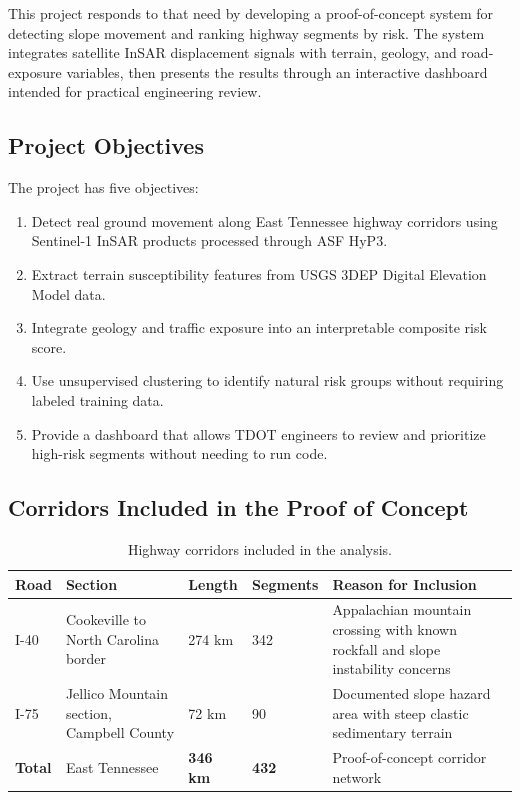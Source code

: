 \documentclass[11pt,letterpaper]{article}
\begin{document}
This project responds to that need by developing a proof-of-concept system for detecting slope movement and ranking highway segments by risk. The system integrates satellite InSAR displacement signals with terrain, geology, and road-exposure variables, then presents the results through an interactive dashboard intended for practical engineering review.

\subsection{Project Objectives}

The project has five objectives:

\begin{enumerate}
  \item Detect real ground movement along East Tennessee highway corridors using Sentinel-1 InSAR products processed through ASF HyP3.
  \item Extract terrain susceptibility features from USGS 3DEP Digital Elevation Model data.
  \item Integrate geology and traffic exposure into an interpretable composite risk score.
  \item Use unsupervised clustering to identify natural risk groups without requiring labeled training data.
  \item Provide a dashboard that allows TDOT engineers to review and prioritize high-risk segments without needing to run code.
\end{enumerate}

\subsection{Corridors Included in the Proof of Concept}

\begin{table}[H]
\centering
\caption{Highway corridors included in the analysis.}
\label{tab:corridors}
\begin{tabularx}{\linewidth}{L{1.3cm}Y C{1.7cm} C{1.7cm}Y}
\toprule
\textbf{Road} &
\textbf{Section} &
\textbf{Length} &
\textbf{Segments} &
\textbf{Reason for Inclusion} \\
\midrule
I-40 & Cookeville to North Carolina border & 274 km & 342 & Appalachian mountain crossing with known rockfall and slope instability concerns \\
I-75 & Jellico Mountain section, Campbell County & 72 km & 90 & Documented slope hazard area with steep clastic sedimentary terrain \\
\midrule
\textbf{Total} & East Tennessee & \textbf{346 km} & \textbf{432} & Proof-of-concept corridor network \\
\bottomrule
\end{tabularx}
\end{table}
\end{document}
